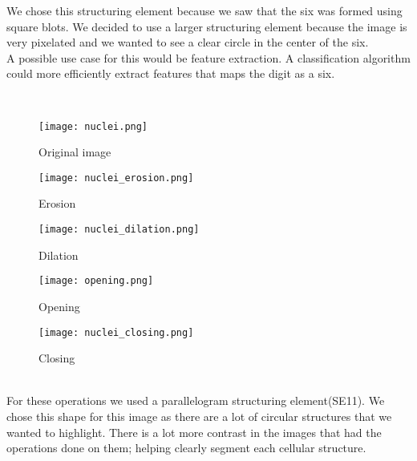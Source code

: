 \documentclass[a4paper]{article}
\begin{document}
We chose this structuring element because we saw that the six was formed using square blots. We decided to use a larger structuring element because the image is very pixelated and we wanted to see a clear circle in the center of the six.\\

A possible use case for this would be feature extraction. A classification algorithm could more efficiently extract features that maps the digit as a six.

\newpage
\large{} \\ 
\begin{figure}[htp]
    \centering
    \texttt{[image: nuclei.png]}
    \caption{Original image}
    \label{fig:erosionSym}
\end{figure}
\begin{figure}[ht] 
  \label{ fig7} 
  \begin{minipage}[b]{0.5\linewidth}
    \centering
    \texttt{[image: nuclei\_erosion.png]} 
    \caption{Erosion} 
    \vspace{4ex}
  \end{minipage}%
  \begin{minipage}[b]{0.5\linewidth}
    \centering
    \texttt{[image: nuclei\_dilation.png]} 
    \caption{Dilation} 
    \vspace{4ex}
  \end{minipage} 
  \begin{minipage}[b]{0.5\linewidth}
    \centering
    \texttt{[image: opening.png]} 
    \caption{Opening} 
    \vspace{4ex}
  \end{minipage}%
  \begin{minipage}[b]{0.5\linewidth}
    \centering
    \texttt{[image: nuclei\_closing.png]} 
    \caption{Closing} 
    \vspace{4ex}
  \end{minipage} 
\end{figure} \\

For these operations we used a parallelogram structuring element(SE11). We chose this shape for this image as there are a lot of circular structures that we wanted to highlight. There is a lot more contrast in the images that had the operations done on them; helping clearly segment each cellular structure.\\
\end{document}
